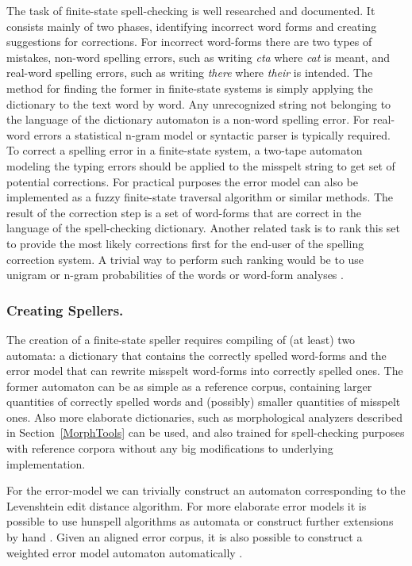 \documentclass{llncs}
\begin{document}
The task of finite-state spell-checking is well researched and documented. It
consists mainly of two phases, identifying incorrect word forms and creating
suggestions for corrections. For incorrect word-forms there are two types of
mistakes, non-word spelling errors, such as writing \emph{cta} where \emph{cat}
is meant, and real-word spelling errors, such as writing \emph{there} where
\emph{their} is intended. The method for finding the former in finite-state systems
is simply applying the dictionary to the text word by word. Any unrecognized
string not belonging to the language of the dictionary automaton is a non-word
spelling error. For real-word errors a statistical n-gram model or syntactic
parser is typically required\cite{}. To correct a spelling error in a finite-state
system, a two-tape automaton modeling the typing errors should be applied to
the misspelt string to get set of potential corrections\cite{pirinen/2010/lrec}.
For practical purposes the error model can also be implemented as a
fuzzy finite-state traversal algorithm or similar methods\cite{oflazer/2002}. The result
of the correction step is a set of word-forms that are correct in the
language of the spell-checking dictionary. Another related task is to rank this
set to provide the most likely corrections first for the end-user of the spelling
correction system. A trivial way to perform such ranking would be to use
unigram \cite{pirinen/2010/lrec} or n-gram probabilities of the words 
\cite{mays/1991} or word-form analyses \cite{pirinen/2012/cicling}.

\subsubsection{Creating Spellers.}

The creation of a finite-state speller requires compiling of (at least) two
automata: a dictionary that contains the correctly spelled word-forms and the
error model that can rewrite misspelt word-forms into correctly spelled ones.
The former automaton can be as simple as a reference corpus, containing larger
quantities of correctly spelled words and (possibly) smaller quantities of
misspelt ones\cite{norvig/2010}. Also more elaborate dictionaries, such as
morphological analyzers described in Section~\ref{MorphTools} can be used, and also
trained for spell-checking purposes with reference corpora without any big
modifications to underlying implementation\cite{pirinen/2010/lrec}.

For the error-model we can trivially construct an automaton corresponding to
the Levenshtein edit distance algorithm\cite{oflazer/1996,agata/2002}. For more elaborate error models
it is possible to use hunspell algorithms as automata \cite{pirinen/2010/il} or
construct further extensions by hand \cite{pirinen/2010/lrec}. Given an
aligned error corpus, it is also possible to construct a weighted error model
automaton automatically \cite{brill/2000}.
\end{document}
